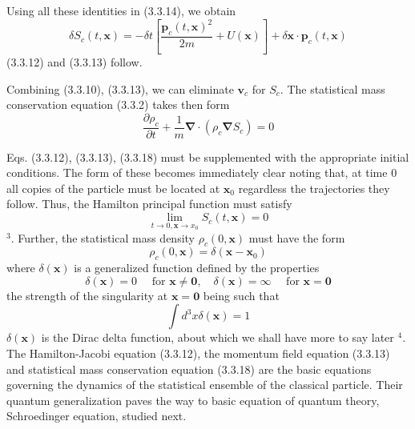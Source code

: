 \documentclass{article}
\begin{document}
Using all these identities in (3.3.14), we obtain
$$
\begin{equation*}
\delta S_{c}(t, \boldsymbol{x})=-\delta t\left[\frac{\boldsymbol{p}_{c}(t, \boldsymbol{x})^{2}}{2 m}+U(\boldsymbol{x})\right]+\delta \boldsymbol{x} \cdot \boldsymbol{p}_{c}(t, \boldsymbol{x}) \tag{3.3.17}
\end{equation*}
$$
(3.3.12) and (3.3.13) follow.

Combining (3.3.10), (3.3.13), we can eliminate $\boldsymbol{v}_{c}$ for $S_{c}$. The statistical mass conservation equation (3.3.2) takes then form
$$
\begin{equation*}
\frac{\partial \rho_{c}}{\partial t}+\frac{1}{m} \boldsymbol{\nabla} \cdot\left(\rho_{c} \boldsymbol{\nabla} S_{c}\right)=0 \tag{3.3.18}
\end{equation*}
$$

Eqs. (3.3.12), (3.3.13), (3.3.18) must be supplemented with the appropriate initial
conditions. The form of these becomes immediately clear noting that, at time 0 all copies of the particle must be located at $\boldsymbol{x}_{0}$ regardless the trajectories they follow. Thus, the Hamilton principal function must satisfy
$$
\begin{equation*}
\lim _{t \rightarrow 0, \boldsymbol{x} \rightarrow x_{0}} S_{c}(t, \boldsymbol{x})=0 \tag{3.3.19}
\end{equation*}
$$
${ }^{3}$. Further, the statistical mass density $\rho_{c}(0, \boldsymbol{x})$ must have the form
$$
\begin{equation*}
\rho_{c}(0, \boldsymbol{x})=\delta\left(\boldsymbol{x}-\boldsymbol{x}_{0}\right) \tag{3.3.20}
\end{equation*}
$$
where $\delta(\boldsymbol{x})$ is a generalized function defined by the properties
$$
\begin{equation*}
\delta(\boldsymbol{x})=0 \quad \text { for } \boldsymbol{x} \neq \mathbf{0}, \quad \delta(\boldsymbol{x})=\infty \quad \text { for } \boldsymbol{x}=\mathbf{0} \tag{3.3.21}
\end{equation*}
$$
the strength of the singularity at $\boldsymbol{x}=\mathbf{0}$ being such that
$$
\begin{equation*}
\int d^{3} x \delta(\boldsymbol{x})=1 \tag{3.3.22}
\end{equation*}
$$
$\delta(\boldsymbol{x})$ is the Dirac delta function, about which we shall have more to say later ${ }^{4}$.
The Hamilton-Jacobi equation (3.3.12), the momentum field equation (3.3.13) and statistical mass conservation equation (3.3.18) are the basic equations governing the dynamics of the statistical ensemble of the classical particle. Their quantum generalization paves the way to basic equation of quantum theory, Schroedinger equation, studied next.
\end{document}
